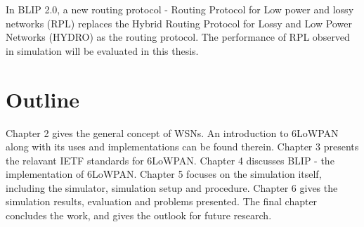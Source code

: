 In BLIP 2.0, a new routing protocol - Routing Protocol for Low power and lossy networks (RPL) replaces the Hybrid Routing Protocol for Lossy and Low Power Networks (HYDRO) as the routing protocol. The performance of RPL observed in simulation will be evaluated in this thesis.
\section{Outline}
\label{Intr:Outline}

Chapter 2 gives the general concept of WSNs. An introduction to 6LoWPAN along with its uses and implementations can be found therein. Chapter 3 presents the relavant IETF standards for 6LoWPAN. Chapter 4 discusses BLIP - the implementation of 6LoWPAN. Chapter 5 focuses on the simulation itself,  including the simulator, simulation setup and procedure. Chapter 6 gives the simulation results, evaluation and problems presented. The final chapter concludes the work, and gives the outlook for future research.

